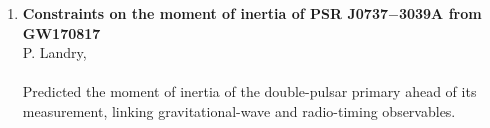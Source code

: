 \begin{enumerate}
\item \lead\textbf{Constraints on the moment of inertia of PSR
J0737$-$3039A from GW170817} \quad {}\\
P. Landry, \me \\
\quad
{}\\
{\small Predicted the moment of inertia of the double-pulsar primary ahead of
its measurement, linking gravitational-wave and radio-timing observables.}

\end{enumerate}
